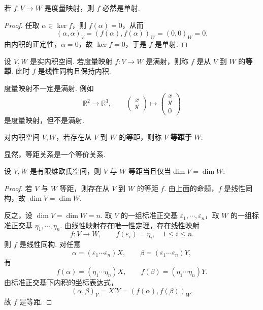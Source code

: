\begin{proposition}
	若 $f:V\longrightarrow W$ 是度量映射，则 $f$ 必然是单射.
\end{proposition}
\begin{proof}
	任取 $\alpha\in\ker f$，则 $f(\alpha)=0$，从而
	\[
	(\alpha,\alpha)_V=(f(\alpha),f(\alpha))_W=(0,0)_W=0.
	\]
	由内积的正定性，$\alpha=0$，故 $\ker f=0$，于是 $f$ 是单射.
\end{proof}

\begin{definition}
	设 $V,W$ 是实内积空间. 若度量映射 $f:V\longrightarrow W$ 是满射，则称 $f$ 是从 $V$ 到 $W$ 的\textbf{等距}. 此时 $f$ 是线性同构且保持内积.
\end{definition}


度量映射不一定是满射. 例如
\[
\mathbb{R}^2\longrightarrow \mathbb{R}^3,
\qquad
\begin{pmatrix}x\\ y\end{pmatrix}
\longmapsto
\begin{pmatrix}x\\ y\\ 0\end{pmatrix}
\]
是度量映射，但不是满射.

\begin{definition}
	对内积空间 $V,W$，若存在从 $V$ 到 $W$ 的等距，则称 $V$ \textbf{等距于} $W$.
\end{definition}
	显然，等距关系是一个等价关系.


\begin{theorem}
	设 $V,W$ 是有限维欧氏空间，则 $V$ 与 $W$ 等距当且仅当$\dim V=\dim W.$
	
\end{theorem}
\begin{proof}
	若 $V$ 与 $W$ 等距，则存在从 $V$ 到 $W$ 的等距 $f$. 由上面的命题，$f$ 是线性同构，故 $\dim V=\dim W$.
	
	反之，设 $\dim V=\dim W=n$. 取 $V$ 的一组标准正交基 $\varepsilon_1,\cdots,\varepsilon_n$，取 $W$ 的一组标准正交基 $\eta_1,\cdots,\eta_n$. 由线性映射存在唯一性定理，存在线性映射
	\[
	f:V\longrightarrow W,
	\qquad
	f(\varepsilon_i)=\eta_i,
	\quad 1\leqslant i\leqslant n.
	\]
	则 $f$ 是线性同构. 对任意
	\[
	\alpha=(\varepsilon_1\cdots\varepsilon_n)X,
	\qquad
	\beta=(\varepsilon_1\cdots\varepsilon_n)Y,
	\]
	有
	\[
	f(\alpha)=(\eta_1\cdots\eta_n)X,
	\qquad
	f(\beta)=(\eta_1\cdots\eta_n)Y.
	\]
	由标准正交基下内积的坐标表达式，
	\[
	(\alpha,\beta)_V=X'Y=(f(\alpha),f(\beta))_W.
	\]
	故 $f$ 是等距.
\end{proof}



